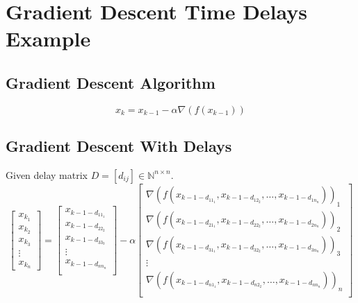 \documentclass[10pt]{elsarticle}
\theoremstyle{remark}
\begin{document}
\section*{Gradient Descent Time Delays Example}

\subsection*{Gradient Descent Algorithm}
\begin{equation}
x_k = x_{k-1} - \alpha\nabla(f(x_{k-1}))
\end{equation}

\subsection*{Gradient Descent With Delays}
Given delay matrix $D=[d_{ij}]\in\mathbb{N}^{n\times n}$.
\[
\begin{bmatrix}
   x_{k_{1}}\\
   x_{k_{2}}\\
   x_{k_{3}}\\
   \vdots\\
   x_{k_{n}}
\end{bmatrix} =
\begin{bmatrix}
   x_{k-1-d_{{11}_1}}\\
   x_{k-1-d_{{22}_2}}\\
   x_{k-1-d_{{33}_3}}\\
   \vdots\\
   x_{k-1-d_{{nn}_n}}\\
\end{bmatrix} - \alpha
\begin{bmatrix}
   \nabla(f(x_{k-1-d_{{11}_1}}, x_{k-1-d_{{12}_2}}, \dots, x_{k-1-d_{{1n}_n}}))_{1} \\
   \nabla(f(x_{k-1-d_{{21}_1}}, x_{k-1-d_{{22}_2}}, \dots, x_{k-1-d_{{2n}_n}}))_{2} \\
   \nabla(f(x_{k-1-d_{{31}_1}}, x_{k-1-d_{{32}_2}}, \dots, x_{k-1-d_{{3n}_n}}))_{3} \\
   \vdots\\
   \nabla(f(x_{k-1-d_{{n1}_1}}, x_{k-1-d_{{n2}_2}}, \dots, x_{k-1-d_{{nn}_n}}))_{n} \\
\end{bmatrix}
\]
\end{document}
